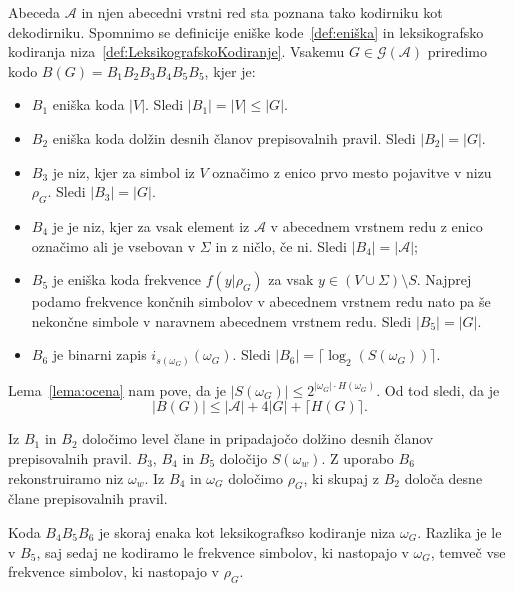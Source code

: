 \documentclass[fin1, tisk]{fmfdelo}
\providecommand{\abs}[1]{\left\lvert #1 \right\rvert}
\newcommand{\A}{\mathcal{A}}
\newcommand{\G}{\mathcal{G}}
\theoremstyle{definition}
\begin{document}
\begin{dokaz}
    Abeceda $\A$ in njen abecedni vrstni red sta poznana tako kodirniku kot dekodirniku.
    Spomnimo se definicije eniške kode~\ref{def:eniška} in leksikografsko 
    kodiranja niza~\ref{def:LeksikografskoKodiranje}.
    Vsakemu $G \in \G(\A)$ priredimo kodo $B(G) = B_1B_2B_3B_4B_5B_5$, kjer je:
    \begin{itemize}
        \item $B_1$ eniška koda $\abs{V}$. Sledi $\abs{B_1} = \abs{V} \leq \abs{G}$.
        \item $B_2$ eniška koda dolžin desnih članov prepisovalnih pravil. Sledi 
        $\abs{B_2} = \abs{G}$.
        \item $B_3$ je niz, kjer za simbol iz $V$ označimo z enico prvo mesto pojavitve v nizu 
        $\rho_G$. Sledi $\abs{B_3} = \abs{G}$.
        \item $B_4$ je  je niz, kjer za vsak element iz $\A$ v abecednem vrstnem redu z 
        enico označimo ali je vsebovan v $\Sigma$ in z ničlo, če ni. Sledi $\abs{B_4} = \abs{\A}$;
        \item $B_5$ je eniška koda frekvence $f(y|\rho_G)$ za vsak 
        $y \in (V \cup \Sigma) \setminus S$. Najprej podamo frekvence končnih simbolov v abecednem
        vrstnem redu nato pa še nekončne simbole v naravnem abecednem vrstnem redu. 
        Sledi $\abs{B_5} = \abs{G}$.
        \item $B_6$ je binarni zapis $i_{s(\omega_G)}(\omega_G)$. Sledi 
        $\abs{B_6} = \lceil \log_2(S(\omega_G)) \rceil$.
    \end{itemize}
    Lema~\ref{lema:ocena} nam pove, da je $\abs{S(\omega_G)} \leq 2^{\abs{\omega_G} \cdot H(\omega_G)}$.
    Od tod sledi, da je 
    \[
        \abs{B(G)} \leq \abs{\A} + 4 \abs{G} + \lceil H(G) \rceil.
    \]
    
    Iz $B_1$ in $B_2$ določimo level člane in pripadajočo dolžino desnih članov prepisovalnih pravil.
    $B_3$, $B_4$ in $B_5$ določijo $S(\omega_w)$. Z uporabo $B_6$ rekonstruiramo niz $\omega_w$.
    Iz $B_4$ in $\omega_G$ določimo $\rho_G$, ki skupaj z $B_2$ določa desne člane prepisovalnih
    pravil. 
\end{dokaz}

\begin{opomba}
    Koda $B_4B_5B_6$ je skoraj enaka kot leksikografkso kodiranje niza $\omega_G$. Razlika je le 
    v $B_5$, saj sedaj ne kodiramo le frekvence simbolov, ki nastopajo v $\omega_G$, temveč vse
    frekvence simbolov, ki nastopajo v $\rho_G$.
\end{opomba}
\end{document}
